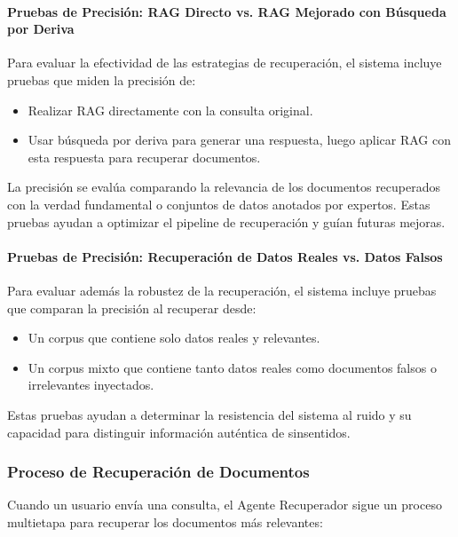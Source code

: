 \documentclass[12pt]{article}
\begin{document}
\paragraph{Pruebas de Precisión: RAG Directo vs. RAG Mejorado con Búsqueda por Deriva}
Para evaluar la efectividad de las estrategias de recuperación, el sistema incluye pruebas que miden la precisión de:
\begin{itemize}
    \item Realizar RAG directamente con la consulta original.
    \item Usar búsqueda por deriva para generar una respuesta, luego aplicar RAG con esta respuesta para recuperar documentos.
\end{itemize}
La precisión se evalúa comparando la relevancia de los documentos recuperados con la verdad fundamental o conjuntos de datos anotados por expertos. Estas pruebas ayudan a optimizar el pipeline de recuperación y guían futuras mejoras.

\paragraph{Pruebas de Precisión: Recuperación de Datos Reales vs. Datos Falsos}
Para evaluar además la robustez de la recuperación, el sistema incluye pruebas que comparan la precisión al recuperar desde:
\begin{itemize}
    \item Un corpus que contiene solo datos reales y relevantes.
    \item Un corpus mixto que contiene tanto datos reales como documentos falsos o irrelevantes inyectados.
\end{itemize}
Estas pruebas ayudan a determinar la resistencia del sistema al ruido y su capacidad para distinguir información auténtica de sinsentidos.


\subsubsection{Proceso de Recuperación de Documentos}
Cuando un usuario envía una consulta, el Agente Recuperador sigue un proceso multietapa para recuperar los documentos más relevantes:
\end{document}
